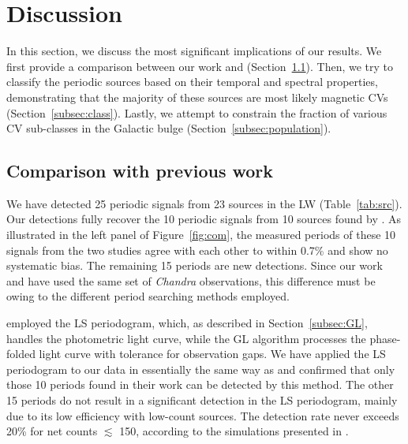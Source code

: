\documentclass[fleqn,usenatbib]{mnras}
\begin{document}
\section{Discussion}\label{sec:discussion}
In this section, we discuss the most significant implications of our results. We first provide a comparison between our work and \cite{2012ApJ...746..165H} (Section~\ref{subsec:compare}). Then, we try to classify the periodic sources based on their temporal and spectral properties, demonstrating that the majority of these sources are most likely magnetic CVs (Section~\ref{subsec:class}). Lastly, we attempt to constrain the fraction of various CV sub-classes in the Galactic bulge (Section~\ref{subsec:population}).

\subsection{Comparison with previous work} \label{subsec:compare}
We have detected 25 periodic signals from 23 sources in the LW (Table~\ref{tab:src}). 
Our detections fully recover the 10 periodic signals from 10 sources found by \cite{2012ApJ...746..165H}. 
As illustrated in the left panel of Figure~\ref{fig:com}, the measured periods of these 10 signals from the two studies agree with each other to within 0.7\% and show no systematic bias.
The remaining 15 periods are new detections. 
Since our work and \cite{2012ApJ...746..165H} have used the same set of {\it Chandra} observations, 
this difference must be owing to the different period searching methods employed.

\cite{2012ApJ...746..165H} employed the LS periodogram,
which, as described in Section~\ref{subsec:GL}, handles the photometric light curve, while the GL algorithm processes the phase-folded light curve with tolerance for observation gaps. We have applied the LS periodogram to our data in essentially the same way as \cite{2012ApJ...746..165H} and confirmed that only those 10 periods found in their work can be detected by this method. 
The other 15 periods do not result in a significant detection in the LS periodogram, mainly due to its low efficiency with low-count sources.
The detection rate 
never exceeds 20\% for net counts $\lesssim$ 150, according to the simulations presented in \citet[figure 7 therein]{2012ApJ...746..165H}.
\end{document}
